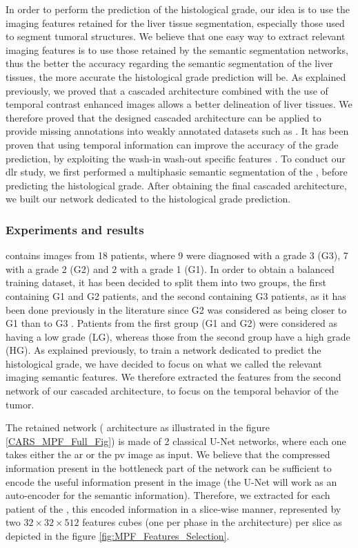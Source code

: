 In order to perform the prediction of the histological grade, our idea
is to use the imaging features retained for the liver tissue
segmentation, especially those used to segment tumoral structures.
We believe that one easy way to extract relevant imaging features is to
use those retained by the semantic segmentation networks, thus the
better the accuracy regarding the semantic segmentation of the liver
tissues, the more accurate the histological grade prediction will be.
As explained previously, we proved that a cascaded architecture combined
with the use of temporal contrast enhanced images allows a better
delineation of liver tissues. We therefore proved that the designed cascaded architecture can be applied to provide missing annotations into weakly annotated datasets such as \textbf{}.
It has been proven that using temporal information can improve the accuracy of the grade prediction, by exploiting the wash-in wash-out specific features \cite{Okamoto2012}.
To conduct our \ac{dlr} study, we first performed a multiphasic
semantic segmentation of the \textbf{}, before predicting the
histological grade.
After obtaining the final cascaded architecture, we built our network dedicated to the
histological grade prediction.

\subsubsection{Experiments and results}

 contains images from 18 patients, where 9 were diagnosed with a
grade 3 (G3), 7 with a grade 2 (G2) and 2 with a grade 1 (G1). In order
to obtain a balanced training dataset, it has been decided to split them
into two groups, the first containing G1 and G2 patients, and the second containing G3 patients, as it has been done previously in the literature since G2
was considered as being closer to G1 than to G3 \cite{Han2013,Zucman-Rossi2015}. Patients from the first group (G1 and G2) were considered as
having a low grade (LG), whereas those from the second group have a high
grade (HG).
As explained previously, to train a network dedicated to predict the
histological grade, we have decided to focus on what we called the
relevant imaging semantic features.
We therefore extracted the features from the second network of our
cascaded architecture, to focus on the temporal behavior of the tumor.

The retained network ( architecture as illustrated in the figure \ref{CARS_MPF_Full_Fig}) is made of 2 classical U-Net networks, where each
one takes either the \ac{ar} or the \ac{pv} image as input. We believe
that the compressed information present in the bottleneck part of the
network can be sufficient to encode the useful information present in the
image (the U-Net will work as an auto-encoder for the semantic information). Therefore, we extracted for each patient of the \textbf{}, this
encoded information in a slice-wise manner, represented by two $ 32\times32\times512 $
features cubes (one per phase in the  architecture) per slice
as depicted in the figure \ref{fig:MPF_Features_Selection}.


